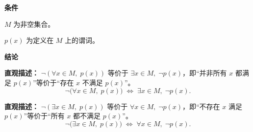 \begin{statementbox}
	\textbf{\textcolor{CStatement}{条件}}
	\begin{description}[style=nextline, leftmargin=2.8em, labelsep=0.5em, itemsep=0.35em]
		\item[\textbf{\textcolor{CStatement}{条件1（论域非空）：}}] $M$ 为非空集合。
		\item[\textbf{\textcolor{CStatement}{条件2（谓词定义）：}}] $p(x)$ 为定义在 $M$ 上的谓词。
	\end{description}

	\textbf{\textcolor{CStatement}{结论}}
	\begin{description}[style=nextline, leftmargin=2.8em, labelsep=0.5em, itemsep=0.45em]
		\item[\textbf{\textcolor{CStatement}{结论一（全称否定）：}}]
			\textbf{\textcolor{CStatement}{直观描述：}}
			$\neg(\forall x\in M,\; p(x))$ 等价于 $\exists x\in M,\; \neg p(x)$，即“并非所有 $x$ 都满足 $p(x)$”等价于“存在 $x$ 不满足 $p(x)$”。
			\[
				\neg\big(\forall x\in M,\; p(x)\big) \;\Longleftrightarrow\; \exists x\in M,\; \neg p(x).
			\]

		\item[\textbf{\textcolor{CStatement}{推广结论（对偶规则）：}}]
			\textbf{\textcolor{CStatement}{直观描述：}}
			$\neg(\exists x\in M,\; p(x))$ 等价于 $\forall x\in M,\; \neg p(x)$，即“不存在 $x$ 满足 $p(x)$”等价于“所有 $x$ 都不满足 $p(x)$”。
			\[
				\neg\big(\exists x\in M,\; p(x)\big) \;\Longleftrightarrow\; \forall x\in M,\; \neg p(x).
			\]
	\end{description}
\end{statementbox}
